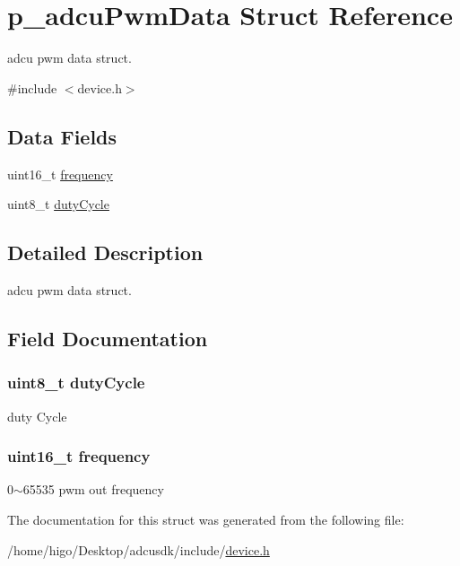\hypertarget{structp__adcuPwmData}{}\section{p\+\_\+adcu\+Pwm\+Data Struct Reference}
\label{structp__adcuPwmData}


adcu pwm data struct.  




{\ttfamily \#include $<$device.\+h$>$}

\subsection*{Data Fields}
\begin{DoxyCompactItemize}
\item 
uint16\+\_\+t \hyperlink{structp__adcuPwmData_aea762e0e67fcafaf5b3cd61201769926}{frequency}
\item 
uint8\+\_\+t \hyperlink{structp__adcuPwmData_a1b27f9b6825bec58e8310f45482ab7da}{duty\+Cycle}
\end{DoxyCompactItemize}


\subsection{Detailed Description}
adcu pwm data struct. 

\subsection{Field Documentation}
\subsubsection[{\texorpdfstring{duty\+Cycle}{dutyCycle}}]{\setlength{\rightskip}{0pt plus 5cm}uint8\+\_\+t duty\+Cycle}\hypertarget{structp__adcuPwmData_a1b27f9b6825bec58e8310f45482ab7da}{}\label{structp__adcuPwmData_a1b27f9b6825bec58e8310f45482ab7da}
duty Cycle 
\subsubsection[{\texorpdfstring{frequency}{frequency}}]{\setlength{\rightskip}{0pt plus 5cm}uint16\+\_\+t frequency}\hypertarget{structp__adcuPwmData_aea762e0e67fcafaf5b3cd61201769926}{}\label{structp__adcuPwmData_aea762e0e67fcafaf5b3cd61201769926}
0$\sim$65535 pwm out frequency 

The documentation for this struct was generated from the following file\+:\begin{DoxyCompactItemize}
\item 
/home/higo/\+Desktop/adcusdk/include/\hyperlink{device_8h}{device.\+h}\end{DoxyCompactItemize}
